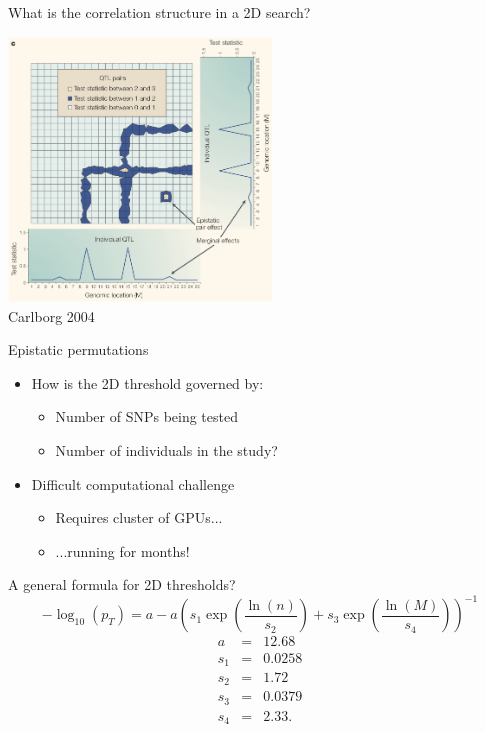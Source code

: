 \documentclass{beamer}
\begin{document}
\begin{frame}{What is the correlation structure in a 2D search?}
\begin{center}
\includegraphics[width=7cm]{2dscan.png} \\
{\tiny Carlborg 2004}
\end{center}
\end{frame}

\begin{frame}{Epistatic permutations}
\begin{itemize}
\item How is the 2D threshold governed by:
\begin{itemize}
\item Number of SNPs being tested
\item Number of individuals in the study?
\end{itemize}
\item Difficult computational challenge
\begin{itemize}
\item Requires cluster of GPUs...
\item ...running for months!
\end{itemize}
\end{itemize}
\end{frame}


\begin{frame}{A general formula for 2D thresholds?}
\begin{equation}
-\log_{10}(p_{T}) = a - a \left ( 
 s_{1} \exp \left ( 
  \frac {\ln(n) } { s_{2} } \right )
 + s_{3} \exp \left (
  \frac{ \ln(M)} {s_{4}} \right ) 
\right )^{-1} \nonumber
\label{eqn:general_threshold}
\end{equation}
\begin{eqnarray}
a & = & 12.68 \nonumber \\
s_{1} & = & 0.0258 \nonumber \\
s_{2} & = & 1.72 \nonumber \\
s_{3} & = & 0.0379 \nonumber \\
s_{4} & = & 2.33. \nonumber
\end{eqnarray}
\end{frame}
\end{document}
